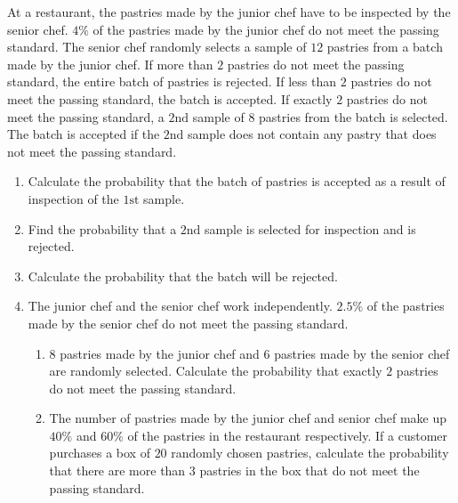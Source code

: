 \documentclass[11pt,a4paper]{book}
\begin{document}
\begin{example}

At a restaurant, the pastries made by the junior chef have to be inspected
by the senior chef. $4\%$ of the pastries made by the junior chef
do not meet the passing standard. The senior chef randomly selects
a sample of $12$ pastries from a batch made by the junior chef. If
more than $2$ pastries do not meet the passing standard, the entire
batch of pastries is rejected. If less than $2$ pastries do not meet
the passing standard, the batch is accepted. If exactly $2$ pastries
do not meet the passing standard, a $2\text{nd}$ sample of $8$ pastries
from the batch is selected. The batch is accepted if the $2\text{nd}$
sample does not contain any pastry that does not meet the passing
standard.

\begin{enumerate}[label=(\alph*)]

\item  Calculate the probability that the batch of pastries is accepted
as a result of inspection of the $1\text{st}$ sample.

\item  Find the probability that a $2\text{nd}$ sample is selected for inspection and is rejected.

\item  Calculate the probability that the batch will be rejected.

\item  The junior chef and the senior chef work independently. $2.5\%$
of the pastries made by the senior chef do not meet the passing standard.

\begin{enumerate}[label=(\roman*)]

\item  $8$ pastries made by the junior chef and $6$ pastries made
by the senior chef are randomly selected. Calculate the probability
that exactly $2$ pastries do not meet the passing standard.

\item  The number of pastries made by the junior chef and senior
chef make up $40\%$ and $60\%$ of the pastries in the restaurant
respectively. If a customer purchases a box of $20$ randomly chosen
pastries, calculate the probability that there are more than $3$
pastries in the box that do not meet the passing standard.

\end{enumerate}


\end{enumerate}
\end{example}
\end{document}
